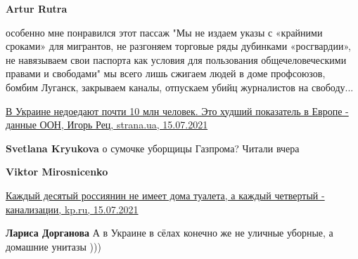 \begin{itemize}
\begin{itemize}
 
\textbf{Artur Rutra} 

особенно мне понравился этот пассаж "Мы не издаем указы с «крайними сроками»
для мигрантов, не разгоняем торговые ряды дубинками «росгвардии», не навязываем
свои паспорта как условия для пользования общечеловеческими правами и
свободами" мы всего лишь сжигаем людей в доме профсоюзов, бомбим Луганск,
закрываем каналы, отпускаем убийц журналистов на свободу...


\href{https://strana.ua/news/343776-holod-v-ukraine-ot-nekhvatki-edy-stradajut-pochti-10-mln-chelovek.html}{%
В Украине недоедают почти 10 млн человек. Это худший показатель в Европе - данные ООН, Игорь Рец, strana.ua, 15.07.2021%
}

 
\textbf{Svetlana Kryukova} о сумочке уборщицы Газпрома? Читали вчера

 
\textbf{Viktor Mirosnicenko} 

\href{https://www.kp.ru/daily/28304/4444300/}{%
Каждый десятый россиянин не имеет дома туалета, а каждый четвертый - канализации, kp.ru, 15.07.2021}

 
\textbf{Лариса Дорганова} А в Украине в сёлах конечно же не уличные уборные, а домашние унитазы )))


\end{itemize}
\end{itemize}
